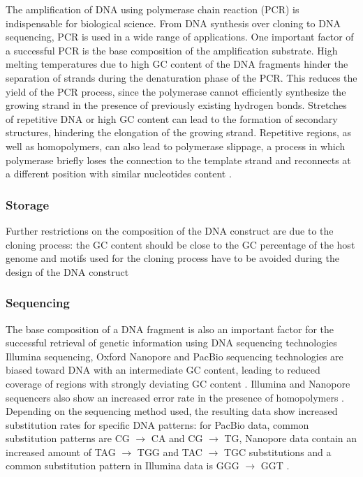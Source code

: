 The amplification of DNA using polymerase chain reaction (PCR) is indispensable for biological science. From DNA synthesis over cloning to DNA sequencing, PCR is used in a wide range of applications. 
One important factor of a successful PCR is the base composition of the amplification substrate. High melting temperatures due to high GC content of the DNA fragments hinder the separation of strands during the denaturation phase of the PCR. 
This reduces the yield of the PCR process, since the polymerase cannot efficiently synthesize the growing strand in the presence of previously existing hydrogen bonds. 
Stretches of repetitive DNA or high GC content can lead to the formation of secondary structures, hindering the elongation of the growing strand. 
Repetitive regions, as well as homopolymers, can also lead to polymerase slippage, a process in which polymerase briefly loses the connection to the template strand and reconnects at a different position with similar nucleotides content \cite{bib:102144}.

\subsubsection{Storage}

Further restrictions on the composition of the DNA construct are due to the cloning process: the GC content should be close to the GC percentage of the host genome and motifs used for the cloning process have to be avoided during the design of the DNA construct

\subsubsection{Sequencing}

The base composition of a DNA fragment is also an important factor for the successful retrieval of genetic information using DNA sequencing technologies
Illumina sequencing, Oxford Nanopore and PacBio sequencing technologies are biased toward DNA with an intermediate GC content, leading to reduced coverage of regions with strongly deviating GC content \cite{bib:101093}. 
Illumina and Nanopore sequencers also show an increased error rate in the presence of homopolymers \cite{bib:101093}.
Depending on the sequencing method used, the resulting data show increased substitution rates for specific DNA patterns: for PacBio data, common substitution patterns are CG $\rightarrow$ CA and CG $\rightarrow$ TG, Nanopore data contain an increased amount of TAG $\rightarrow$ TGG and TAC $\rightarrow$ TGC substitutions \cite{bib:1012688} and a common substitution pattern in Illumina data is GGG $\rightarrow$ GGT \cite{bib:101186}.

